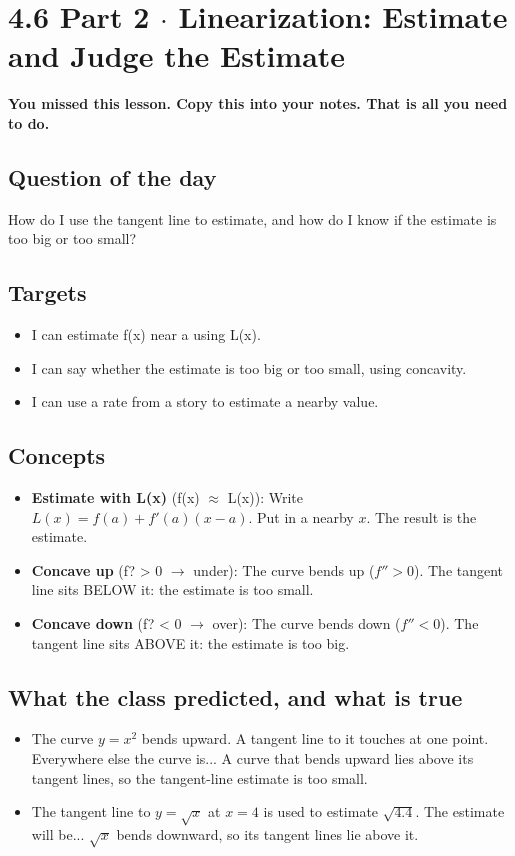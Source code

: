 \documentclass[11pt]{article}
\begin{document}
\section*{4.6 Part 2 $\cdot$ Linearization: Estimate and Judge the Estimate}
\textbf{You missed this lesson. Copy this into your notes. That is all you need to do.}\par\medskip
\subsection*{Question of the day}
How do I use the tangent line to estimate, and how do I know if the estimate is too big or too small?\par
\subsection*{Targets}\begin{itemize}\item I can estimate f(x) near a using L(x).
\item I can say whether the estimate is too big or too small, using concavity.
\item I can use a rate from a story to estimate a nearby value.\end{itemize}
\subsection*{Concepts}\begin{itemize}
\item \textbf{Estimate with L(x)} (f(x) $\approx$ L(x)): Write $L(x)=f(a)+f'(a)(x-a)$. Put in a nearby $x$. The result is the estimate.
\item \textbf{Concave up} (f? > 0 $\rightarrow$ under): The curve bends up ($f''>0$). The tangent line sits BELOW it: the estimate is too small.
\item \textbf{Concave down} (f? < 0 $\rightarrow$ over): The curve bends down ($f''<0$). The tangent line sits ABOVE it: the estimate is too big.
\end{itemize}
\subsection*{What the class predicted, and what is true}\begin{itemize}
\item The curve $y=x^2$ bends upward. A tangent line to it touches at one point. Everywhere else the curve is...  A curve that bends upward lies above its tangent lines, so the tangent-line estimate is too small.
\item The tangent line to $y=\sqrt{x}$ at $x=4$ is used to estimate $\sqrt{4.4}$. The estimate will be...  $\sqrt{x}$ bends downward, so its tangent lines lie above it.
\end{itemize}
\end{document}
